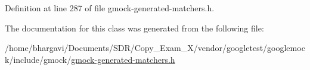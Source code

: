 Definition at line 287 of file gmock-\/generated-\/matchers.\+h.



The documentation for this class was generated from the following file\+:\begin{DoxyCompactItemize}
\item 
/home/bhargavi/\+Documents/\+S\+D\+R/\+Copy\+\_\+\+Exam\+\_\+X/vendor/googletest/googlemock/include/gmock/\hyperlink{gmock-generated-matchers_8h}{gmock-\/generated-\/matchers.\+h}\end{DoxyCompactItemize}

